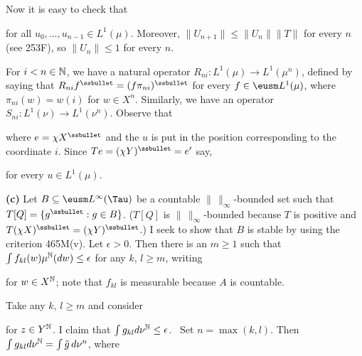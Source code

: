 {Now it is easy to check that


\noindent for all $u_0,\ldots,u_{n-1}\in L^1(\mu)$.   Moreover,
$\|U_{n+1}\|\le\|U_n\|\|T\|$ for every $n$ (see 253F), so $\|U_n\|\le 1$
for every $n$.

For $i<n\in\Bbb N$, we have a natural operator $R_{ni}:L^1(\mu)\to
L^1(\mu^n)$, defined by saying that
$R_{ni}f^{\ssbullet}=(f\pi_{ni})^{\ssbullet}$ for every
$f\in\eusm L^1(\mu)$, where $\pi_{ni}(w)=w(i)$ for $w\in X^n$.
Similarly, we have
an operator $S_{ni}:L^1(\nu)\to L^1(\nu^n)$.   Observe that


\noindent where $e=\chi X^{\ssbullet}$ and the $u$ is put in the
position corresponding to the coordinate $i$.   Since
$Te=(\chi Y)^{\ssbullet}=e'$ say,


\noindent for every $u\in L^1(\mu)$.

\medskip

{\bf (c)} Let $B\subseteq\eusm L^{\infty}(\Tau)$ be a countable
$\|\,\|_{\infty}$-bounded set such that $T[Q]=\{g^{\ssbullet}:g\in B\}$.
($T[Q]$ is $\|\,\|_{\infty}$-bounded because $T$ is positive and
$T(\chi X)^{\ssbullet}=(\chi Y)^{\ssbullet}$.)   I seek to show that $B$
is stable by using the criterion 465M(v).   Let $\epsilon>0$.   Then
there is an $m\ge 1$ such that
$\int f_{kl}(w)\mu^{\Bbb N}(dw)\le\epsilon$ for any $k$, $l\ge m$,
writing


\noindent for $w\in X^{\Bbb N}$;  note that $f_{kl}$ is measurable
because $A$ is countable.

Take any $k$, $l\ge m$ and consider


\noindent for $z\in Y^{\Bbb N}$.   I claim that
$\int g_{kl}d\nu^{\Bbb N}\le\epsilon$.   \Prf\ Set $n=\max(k,l)$.   Then
$\int g_{kl}d\nu^{\Bbb N}=\int\tilde g\,d\nu^n$, where


}
